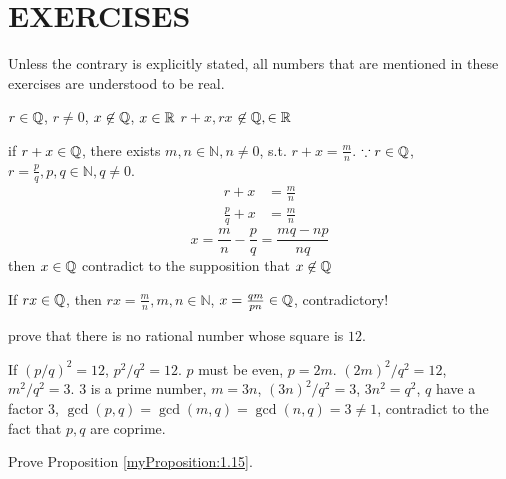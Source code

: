 \section*{EXERCISES}

Unless the contrary is explicitly stated, all numbers that are mentioned in these exercises are understood to be real.

\begin{myExercise}
    \label{ex:1.1}
    $r \in {\protect\mathbb Q} $, $r \neq 0$, $x \not\in {\protect\mathbb Q} $, $x \in {\protect\mathbb R}$
    $r+x, rx$ $\not\in {\protect\mathbb Q} , \in {\protect\mathbb R}$
\end{myExercise}


\mySolve

if $r+x \in {\protect\mathbb Q} $, there exists $m, n \in \mathbb{N}, n \neq 0$, s.t. $r+x = \frac{m}{n}$.
    $\because r\in {\protect\mathbb Q} $, $r = \frac{p}{q}, p,q \in \mathbb{N}, q \neq 0$.
    \begin{align*}
        r + x &= \frac{m}{n}\\
        \frac{p}{q} + x &= \frac{m}{n}
    \end{align*}
    \begin{equation*}
        x = \frac{m}{n} - \frac{p}{q} = \frac{mq-np}{nq}
    \end{equation*}
    then $x \in {\protect\mathbb Q} $ contradict to the supposition that $x \not\in {\protect\mathbb Q} $

    If $rx \in {\protect\mathbb Q} $, then $rx = \frac{m}{n}, m,n\in \mathbb{N}$, $x = \frac{qm}{pn} \in {\protect\mathbb Q} $, contradictory!



\begin{myExercise}
    \label{ex:1.2}
    prove that there is no rational number whose square is $12$. 
\end{myExercise}


\mySolve

If $\left(p/q\right)^2 = 12$, $p^2/q^2 = 12$. $p$ must be even, $p = 2m$.
    $(2m)^2/q^2 = 12$, $m^2/q^2=3$. 
    $3$ is a prime number, $m = 3n$, $(3n)^2/q^2 = 3$, $3n^2 = q^2$, $q$ have a factor $3$,
    $\gcd(p,q) = \gcd(m,q) = \gcd(n,q) = 3 \neq 1$, contradict to the fact that $p,q$ are coprime.


\begin{myExercise}
    \label{ex:1.3}
    Prove Proposition \ref{myProposition:1.15}.
\end{myExercise}


\mySolve

